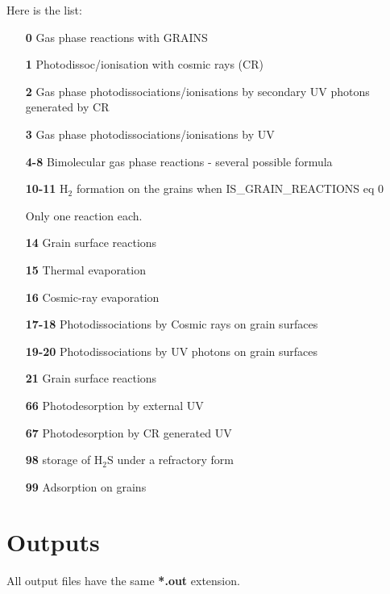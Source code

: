 \documentclass[english,a4paper,twoside]{article}
\newcommand{\molecule}[1]{\ensuremath{\mathrm{#1}}}
\begin{document}
Here is the list:
\begin{itemize}
\item[\textbf{0}] Gas phase reactions with GRAINS
\item[\textbf{1}] Photodissoc/ionisation with cosmic rays (CR)
\item[\textbf{2}] Gas phase photodissociations/ionisations by secondary UV photons generated by CR
\item[\textbf{3}] Gas phase photodissociations/ionisations by UV
\item[\textbf{4-8}] Bimolecular gas phase reactions - several possible formula 
\item[\textbf{10-11}] \molecule{H_2} formation on the grains when IS\_GRAIN\_REACTIONS eq 0
\begin{remarque}
Only one reaction each.
\end{remarque}
\item[\textbf{14}] Grain surface reactions
\item[\textbf{15}] Thermal evaporation
\item[\textbf{16}] Cosmic-ray evaporation
\item[\textbf{17-18}] Photodissociations by Cosmic rays on grain surfaces
\item[\textbf{19-20}] Photodissociations by UV photons on grain surfaces
\item[\textbf{21}] Grain surface reactions
\item[\textbf{66}] Photodesorption by external UV
\item[\textbf{67}] Photodesorption by CR generated UV
\item[\textbf{98}] storage of $\molecule{H_2S}$ under a refractory form
\item[\textbf{99}] Adsorption on grains
\end{itemize}

\section{Outputs}
\begin{attention}
All output files have the same \textbf{*.out} extension.
\end{attention}
\end{document}
